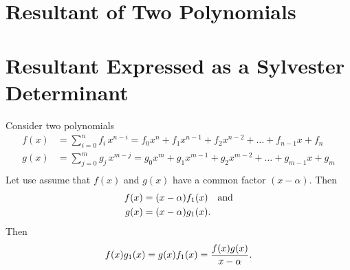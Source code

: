 \section{Resultant of Two Polynomials}


\section{Resultant Expressed as a Sylvester Determinant}

Consider two polynomials 
\begin{align*}
f(x)  &= \sum_{i=0}^n f_i\,x^{n-i} = f_0 x^n + f_1 x^{n-1} + f_2 x^{n-2} + \hdots + f_{n-1} x + f_n\\
g(x) &=  \sum_{j=0}^m g_j\,x^{m-j} = g_0 x^m + g_1 x^{m-1} + g_2 x^{m-2} + \hdots + g_{m-1} x + g_m\\
\end{align*}
Let use assume that $f(x)$ and $g(x)$ have a common factor $(x-\alpha)$. Then 
\begin{align*} f(x) &= (x-\alpha) f_1(x) \quad \hbox{and} \\
                     g(x) & = (x-\alpha) g_1(x).\end{align*}
Then $$f(x) g_1(x) = g(x) f_1(x) = {f(x) g(x) \over x-\alpha}.$$
 

